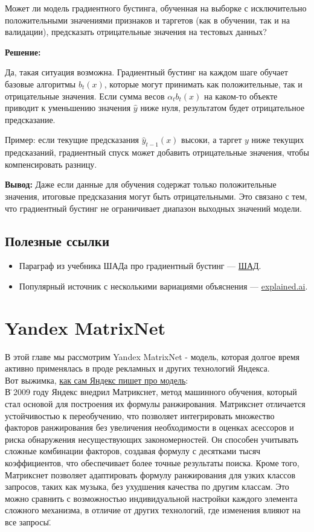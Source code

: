 Может ли модель градиентного бустинга, обученная на выборке с исключительно положительными значениями признаков и таргетов (как в обучении, так и на валидации), предсказать отрицательные значения на тестовых данных?

\textbf{Решение:}

Да, такая ситуация возможна. Градиентный бустинг на каждом шаге обучает базовые алгоритмы $b_t(x)$, которые могут принимать как положительные, так и отрицательные значения. Если сумма весов $\alpha_t b_t(x)$ на каком-то объекте приводит к уменьшению значения $\hat{y}$ ниже нуля, результатом будет отрицательное предсказание.

Пример: если текущие предсказания $\hat{y}_{t-1}(x)$ высоки, а таргет $y$ ниже текущих предсказаний, градиентный спуск может добавить отрицательные значения, чтобы компенсировать разницу.

\textbf{Вывод:} Даже если данные для обучения содержат только положительные значения, итоговые предсказания могут быть отрицательными. Это связано с тем, что градиентный бустинг не ограничивает диапазон выходных значений модели.

\subsection{Полезные ссылки}
\begin{itemize}
    \item Параграф из учебника ШАДа про градиентный бустинг — \href{https://education.yandex.ru/handbook/ml/article/gradientnyj-busting}{ШАД}.
    \item Популярный источник с несколькими вариациями объяснения — \href{https://explained.ai/gradient-boosting/}{explained.ai}.
\end{itemize}

\section{Yandex MatrixNet}
В этой главе мы рассмотрим Yandex MatrixNet - модель, которая долгое время активно применялась в проде рекламных и других технологий Яндекса. \\
Вот выжимка, \href{https://yandex.ru/company/technologies/matrixnet/}{как сам Яндекс пишет про модель}:\\
\"В 2009 году Яндекс внедрил Матрикснет, метод машинного обучения, который стал основой для построения их формулы ранжирования. Матрикснет отличается устойчивостью к переобучению, что позволяет интегрировать множество факторов ранжирования без увеличения необходимости в оценках асессоров и риска обнаружения несуществующих закономерностей. Он способен учитывать сложные комбинации факторов, создавая формулу с десятками тысяч коэффициентов, что обеспечивает более точные результаты поиска. Кроме того, Матрикснет позволяет адаптировать формулу ранжирования для узких классов запросов, таких как музыка, без ухудшения качества по другим классам. Это можно сравнить с возможностью индивидуальной настройки каждого элемента сложного механизма, в отличие от других технологий, где изменения влияют на все запросы\".

